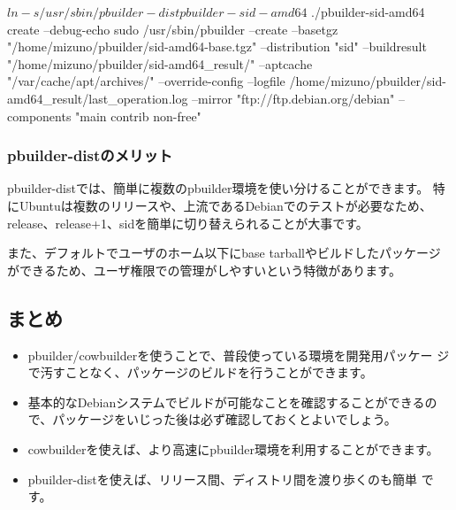 \documentclass[mingoth,a4paper]{jsarticle}
\begin{document}
\begin{commandline}
$ ln -s /usr/sbin/pbuilder-dist pbuilder-sid-amd64
$ ./pbuilder-sid-amd64 create --debug-echo
sudo /usr/sbin/pbuilder --create --basetgz "/home/mizuno/pbuilder/sid-amd64-base.tgz" --distribution "sid"
--buildresult "/home/mizuno/pbuilder/sid-amd64_result/" --aptcache "/var/cache/apt/archives/"
--override-config --logfile /home/mizuno/pbuilder/sid-amd64_result/last_operation.log
--mirror "ftp://ftp.debian.org/debian" --components "main contrib non-free"
\end{commandline}

\subsubsection{pbuilder-distのメリット}

pbuilder-distでは、簡単に複数のpbuilder環境を使い分けることができます。
特にUbuntuは複数のリリースや、上流であるDebianでのテストが必要なため、
release、release+1、sidを簡単に切り替えられることが大事です。

また、デフォルトでユーザのホーム以下にbase tarballやビルドしたパッケージ
ができるため、ユーザ権限での管理がしやすいという特徴があります。

\subsection{まとめ}

\begin{itemize}
 \item pbuilder/cowbuilderを使うことで、普段使っている環境を開発用パッケー
       ジで汚すことなく、パッケージのビルドを行うことができます。

 \item 基本的なDebianシステムでビルドが可能なことを確認することができるの
       で、パッケージをいじった後は必ず確認しておくとよいでしょう。

 \item cowbuilderを使えば、より高速にpbuilder環境を利用することができます。

 \item pbuilder-distを使えば、リリース間、ディストリ間を渡り歩くのも簡単
       です。

\end{itemize}

\end{document}
